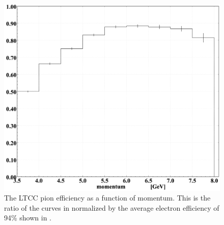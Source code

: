 \begin{figure}
	\centering
	\includegraphics[width=0.98\columnwidth,keepaspectratio]{img/pionEfficiency.png}
	\caption{The LTCC pion efficiency as a function of momentum. This is the ratio of the curves in 
          normalized by the average electron efficiency of 94\% shown in .}
	\label{fig:pionEfficiency}
\end{figure}
